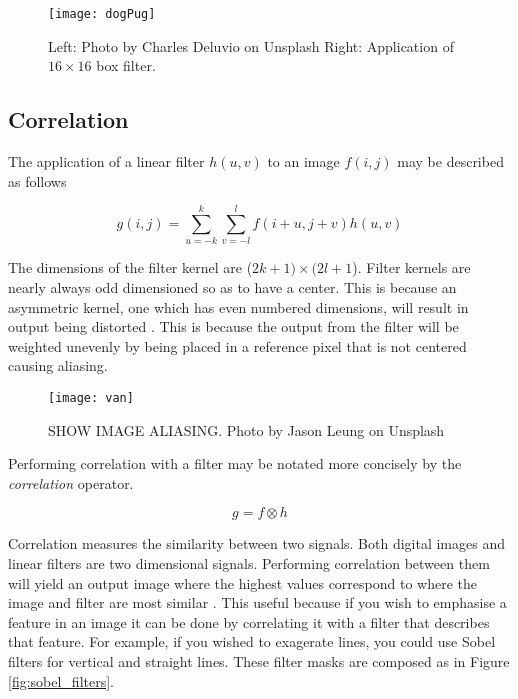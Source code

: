 \begin{figure}[H]
  \centering
  \centering\texttt{[image: dogPug]}
  \caption{Left: Photo by Charles Deluvio on Unsplash Right: Application of $16\times16$ box filter.}
  \label{fig:roughDog}
\end{figure}

\subsection{Correlation}

The application of a linear filter $h(u,v)$ to an image $f(i,j)$ may be described as follows

\begin{equation} \label{eq:1}
g(i,j) = \sum_{u=-k}^{k}\sum_{v = -l}^{l}f(i+u,j+v)h(u,v)
\end{equation}


The dimensions of the filter kernel are ($2k+1) \times (2l+1$). Filter kernels are nearly always odd dimensioned so as to have a center. This is because an asymmetric kernel, one which has even numbered dimensions, will result in output being distorted \cite{optimalKernel}. This is because the output from the filter will be weighted unevenly by being placed in a reference pixel that is not centered causing aliasing.

\begin{figure}[H]
  \centering
  \centering\texttt{[image: van]}
  \caption{SHOW IMAGE ALIASING. Photo by Jason Leung on Unsplash}
  \label{fig:van}
\end{figure}

Performing correlation with a filter may be notated more concisely by the \emph{correlation} operator.

\[g = f \otimes h\]

Correlation measures the similarity between two signals. Both digital images and linear filters are two dimensional signals. Performing correlation between them will yield an output image where the highest values correspond to where the image and filter are most similar \cite{optimalKernel}. This useful because if you wish to emphasise a feature in an image it can be done by correlating it with a filter that describes that feature. For example, if you wished to exagerate lines, you could use Sobel filters for vertical and straight lines. These filter masks are composed as in Figure \ref{fig:sobel_filters}.

